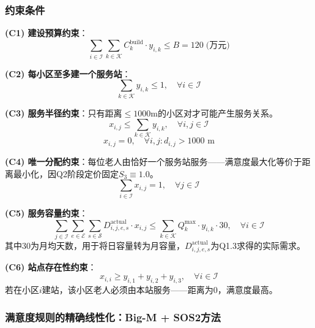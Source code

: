 \subsubsection{约束条件}

\textbf{(C1) 建设预算约束}：
\begin{equation}
\sum_{i\in\mathcal{I}}\sum_{k\in\mathcal{K}} C_k^{\text{build}} \cdot y_{i,k} \le B = 120 \; \text{(万元)}
\end{equation}

\textbf{(C2) 每小区至多建一个服务站}：
\begin{equation}
\sum_{k\in\mathcal{K}} y_{i,k} \le 1, \quad \forall i \in \mathcal{I}
\end{equation}

\textbf{(C3) 服务半径约束}：只有距离$\le 1000$m的小区对才可能产生服务关系。
\begin{equation}
x_{i,j} \le \sum_{k\in\mathcal{K}} y_{i,k}, \quad \forall i,j \in \mathcal{I}
\end{equation}
\begin{equation}
x_{i,j} = 0, \quad \forall i,j: d_{i,j} > 1000 \text{ m}
\end{equation}

\textbf{(C4) 唯一分配约束}：每位老人由恰好一个服务站服务——满意度最大化等价于距离最小化，因Q2阶段定价固定$S_3\equiv1.0$。
\begin{equation}
\sum_{i\in\mathcal{I}} x_{i,j} = 1, \quad \forall j \in \mathcal{I}
\end{equation}

\textbf{(C5) 服务容量约束}：
\begin{equation}
\sum_{j\in\mathcal{I}}\sum_{e\in\mathcal{E}} \sum_{s\in\mathcal{S}} D_{i,j,e,s}^{\text{actual}} \cdot x_{i,j} \le \sum_{k\in\mathcal{K}} Q_k^{\max} \cdot y_{i,k} \cdot 30, \quad \forall i \in \mathcal{I}
\end{equation}
其中30为月均天数，用于将日容量转为月容量，$D_{i,j,e,s}^{\text{actual}}$为Q1.3求得的实际需求。

\textbf{(C6) 站点存在性约束}：
\begin{equation}
x_{i,i} \ge y_{i,1} + y_{i,2} + y_{i,3}, \quad \forall i \in \mathcal{I}
\end{equation}
若在小区$i$建站，该小区老人必须由本站服务——距离为0，满意度最高。

\subsubsection{满意度规则的精确线性化：Big-M + SOS2方法}

